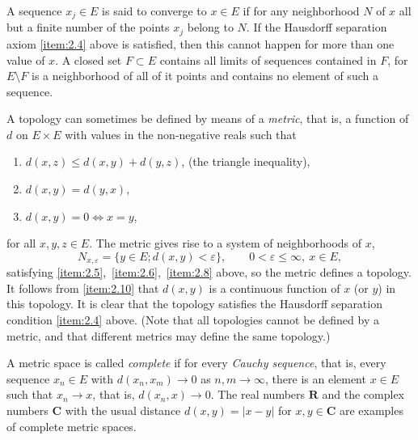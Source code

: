 A sequence $x_j\in E$ is said to converge to $x\in E$ if for any
neighborhood $N$ of $x$ all but a finite number of the points $x_j$
belong to $N$. If the Hausdorff separation axiom \ref{item:2.4} above
is satisfied, then this cannot happen for more than one value of
$x$. A closed set $F\subset E$ contains all limits of sequences
contained in $F$, for $E\setminus F$ is a neighborhood of all of it
points and contains no element of such a sequence.

A topology can sometimes be defined by means of a \emph{metric}, that
is, a function of $d$ on $E\times E$ with values in the non-negative
reals such that
\begin{enumerate}[label=\alph*),itemindent=!,leftmargin=0pt]
\item\label{item:2.10} $d(x,z)\leq d(x,y)+d(y,z)$, (the triangle
  inequality),
\item\label{item:2.11} $d(x,y)=d(y,x)$,
\item\label{item:2.12} $d(x,y)=0\Longleftrightarrow x=y$,
\end{enumerate}
for all $x,y,z\in E$. The metric gives rise to a system of
neighborhoods of $x$,
\begin{displaymath}
  N_{x,\varepsilon} = \{y\in E; d(x,y)<\varepsilon\},\qquad
  0<\varepsilon\leq\infty,\ x\in E,
\end{displaymath}
satisfying \ref{item:2.5},~\ref{item:2.6},~\ref{item:2.8} above, so
the metric defines a topology. It follows from \ref{item:2.10} that
$d(x,y)$ is a continuous function of $x$ (or $y$) in this topology. It
is clear that the topology satisfies the Hausdorff separation
condition \ref{item:2.4} above. (Note that all topologies cannot be
defined by a metric, and that different metrics may define the same
topology.)

A metric space is called \emph{complete} if for every \emph{Cauchy
  sequence}, that is, every sequence $x_n\in E$ with $d(x_n,x_m)\to 0$
as $n,m\to\infty$, there is an element $x\in E$ such that $x_n\to x$,
that is, $d(x_n,x)\to 0$. The real numbers $\mathbf{R}$ and the
complex numbers $\mathbf{C}$ with the usual distance $d(x,y)=|x-y|$
for $x,y\in \mathbf{C}$ are examples of complete metric spaces.

